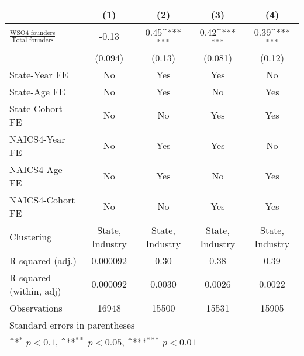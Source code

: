 {
\def\sym#1{\ifmmode^{#1}\else\(^{#1}\)\fi}
\begin{tabular}{l*{4}{c}}
\toprule
                    &\multicolumn{1}{c}{(1)}         &\multicolumn{1}{c}{(2)}         &\multicolumn{1}{c}{(3)}         &\multicolumn{1}{c}{(4)}         \\
\midrule
$\frac{\text{WSO4 founders}}{\text{Total founders}}$&       -0.13         &        0.45\sym{***}&        0.42\sym{***}&        0.39\sym{***}\\
                    &     (0.094)         &      (0.13)         &     (0.081)         &      (0.12)         \\
\addlinespace
State-Year FE       &          No         &         Yes         &         Yes         &          No         \\
\addlinespace
State-Age FE        &          No         &         Yes         &          No         &         Yes         \\
\addlinespace
State-Cohort FE     &          No         &          No         &         Yes         &         Yes         \\
\addlinespace
NAICS4-Year FE      &          No         &         Yes         &         Yes         &          No         \\
\addlinespace
NAICS4-Age FE       &          No         &         Yes         &          No         &         Yes         \\
\addlinespace
NAICS4-Cohort FE    &          No         &          No         &         Yes         &         Yes         \\
\midrule
Clustering          &State, Industry         &State, Industry         &State, Industry         &State, Industry         \\
R-squared (adj.)    &    0.000092         &        0.30         &        0.38         &        0.39         \\
R-squared (within, adj)&    0.000092         &      0.0030         &      0.0026         &      0.0022         \\
Observations        &       16948         &       15500         &       15531         &       15905         \\
\bottomrule
\multicolumn{5}{l}{\footnotesize Standard errors in parentheses}\\
\multicolumn{5}{l}{\footnotesize \sym{*} \(p<0.1\), \sym{**} \(p<0.05\), \sym{***} \(p<0.01\)}\\
\end{tabular}
}
